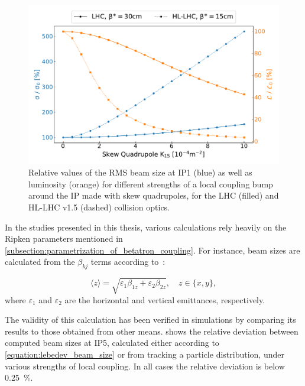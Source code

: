 \begin{figure}[!htb]
    \centering
    \includegraphics*[width=\textwidth]{Figures/IR_Coupling_Correction/lhc_vs_hllhc_combined.pdf}
    \caption{Relative values of the RMS beam size at IP\num{1} (\textcolor{mplblue}{blue}) as well as luminosity (\textcolor{mplorange}{orange}) for different strengths of a local coupling bump around the IP made with skew quadrupoles, for the LHC (filled) and HL-LHC v1.5 (dashed) collision optics.}%
    \label{figure:lhc_vs_hllhc_beam_size_and_lumi_growths}
\end{figure}

In the studies presented in this thesis, various calculations rely heavily on the Ripken parameters mentioned in \cref{subsection:parametrization_of_betatron_coupling}.
For instance, beam sizes are calculated from the \(\beta_{kj}\) terms according to~\cite{IOP:Lebedev:Betatron_Motion_Coupling}:

\begin{equation}
    \langle z \rangle = \sqrt{\varepsilon_1 \beta_{1z} + \varepsilon_2 \beta_{2z}}, \quad z \in\{x, y\} ,
    \label{equation:lebedev_beam_size}
\end{equation}
where \(\varepsilon_1\) and \(\varepsilon_2\) are the horizontal and vertical emittances, respectively.

The validity of this calculation has been verified in simulations by comparing its results to those obtained from other means.
 shows the relative deviation between computed beam sizes at IP\num{5}, calculated either according to \cref{equation:lebedev_beam_size} or from tracking a particle distribution, under various strengths of local coupling.
In all cases the relative deviation is below \qty{0.25}{\percent}.

